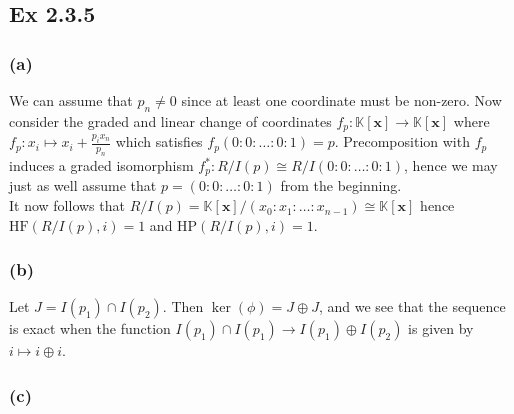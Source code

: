 \documentclass{article}
\theoremstyle{definition}
\newcommand{\K}{\mathbb{K}}
\newcommand{\Kx}{\K[\bm{x}]}
\newcommand{\HF}{\text{HF}}
\newcommand{\HP}{\text{HP}}
\begin{document}
\subsection*{Ex 2.3.5}
\subsubsection*{(a)}

We can assume that $p_n \not = 0$ since at least one coordinate must be
non-zero. Now consider the graded and linear change of coordinates $f_p : \Kx
\to \Kx$ where $f_p : x_i \mapsto x_i + \frac{p_i x_n}{p_n}$ which satisfies
$f_p(0 : 0 : \ldots : 0 : 1) = p$. Precomposition with $f_p$ induces a graded
isomorphism $f_p^* : R/I(p) \cong R/I(0 : 0 : \ldots : 0 : 1)$, hence we may
just as well assume that $p = (0 : 0 : \ldots : 0 : 1)$ from the beginning. \\

It now follows that $R/I(p) = \Kx/(x_0 : x_1 : \dots : x_{n - 1}) \cong \Kx$
hence $\HF(R/I(p), i) = 1$ and $\HP(R/I(p), i) = 1$.

\subsubsection*{(b)}

Let $J = I(p_1) \cap I(p_2)$. Then $\ker(\phi) = J \oplus J$, and we see that
the sequence is exact when the function $I(p_1) \cap I(p_1) \to I(p_1) \oplus
I(p_2)$ is given by $i \mapsto i \oplus i$.

\subsubsection*{(c)}
\end{document}
